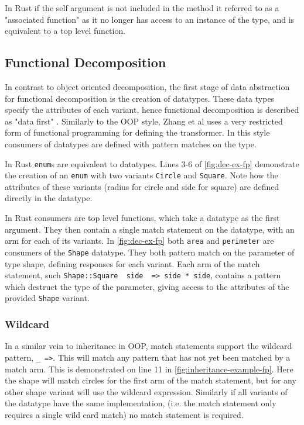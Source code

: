\documentclass[ oneside,%
                    author={James Elgar},
                    degree={MEng},
                     title={Bidirectional transformer between functional and \\ object-oriented programming in Rust},
                  subtitle={}]{dissertation}
\newcommand{\weixin}{Zhang et al }
\newcommand{\rust}[1]{\texttt{#1}}
\begin{document}
In Rust if the self argument is not included in the method it referred to as a "associated function" as it no longer has access to an instance of the type, and is equivalent to a top level function.

\subsection{Functional Decomposition}

In contrast to object oriented decomposition, the first stage of data abstraction for functional decomposition is the creation of datatypes.
These data types specify the attributes of each variant, hence functional decomposition is described as "data first" \cite{food}. 
Similarly to the OOP style, \weixin uses a very restricted form of functional programming for defining the transformer.  
In this style consumers of datatypes are defined with pattern matches on the type.

In Rust \rust{enum}s are equivalent to datatypes. Lines 3-6 of \autoref{fig:dec-ex-fp} demonstrate the creation of an \rust{enum} with two variants \rust{Circle} and \rust{Square}. Note how the attributes of these variants (radius for circle and side for square) are defined directly in the datatype.

In Rust consumers are top level functions, which take a datatype as the first argument. They then contain a single match statement on the datatype, with an arm for each of its variants. In \autoref{fig:dec-ex-fp} both \rust{area} and \rust{perimeter} are consumers of the \rust{Shape} datatype. 
They both pattern match on the parameter of type shape, defining responses for each variant. Each arm of the match statement, such \rust{Shape::Square { side } => side * side}, contains a pattern which destruct the type of the parameter, giving access to the attributes of the provided \rust{Shape} variant.

\subsubsection{Wildcard}

In a similar vein to inheritance in OOP, match statements support the wildcard pattern, \rust{_ =>}. This will match any pattern that has not yet been matched by a match arm. This is demonstrated on line 11 in \autoref{fig:inheritance-example-fp}. Here the shape will match circles for the first arm of the match statement, but for any other shape variant will use the wildcard expression.
Similarly if all variants of the datatype have the same implementation, (i.e. the match statement only requires a single wild card match) no match statement is required. 
\end{document}
